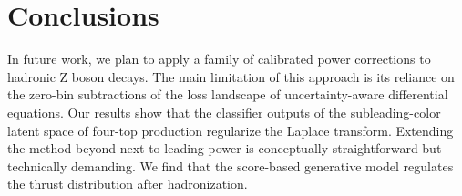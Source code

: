 \section{Conclusions}\label{sec:conclusions}

In future work, we plan to apply a family of calibrated power
corrections to hadronic Z boson decays. The main limitation of this
approach is its reliance on the zero-bin subtractions of the loss
landscape of uncertainty-aware differential equations. Our results show
that the classifier outputs of the subleading-color latent space of
four-top production regularize the Laplace transform. Extending the
method beyond next-to-leading power is conceptually straightforward but
technically demanding. We find that the score-based generative model
regulates the thrust distribution after hadronization.

